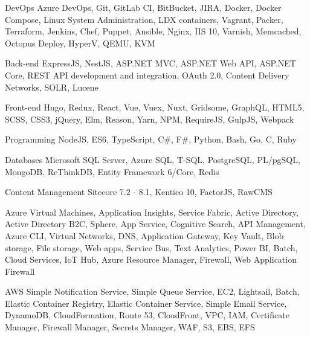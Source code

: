 

\begin{cvskills}

  \cvskill
    {DevOps} %
    {Azure DevOps, Git, GitLab CI, BitBucket, JIRA, Docker, Docker Compose, Linux System Administration, LDX containers, Vagrant, Packer, Terraform, Jenkins, Chef, Puppet, Ansible, Nginx, IIS 10, Varnish, Memcached, Octopus Deploy, HyperV, QEMU, KVM} %

  \cvskill
    {Back-end} %
    {ExpressJS, NestJS, ASP.NET MVC, ASP.NET Web API, ASP.NET Core, REST API development and integration, OAuth 2.0, Content Delivery Networks, SOLR, Lucene} %

  \cvskill
    {Front-end} %
    {Hugo, Redux, React, Vue, Vuex, Nuxt, Gridsome, GraphQL, HTML5, SCSS, CSS3, jQuery, Elm, Reason, Yarn, NPM, RequireJS, GulpJS, Webpack} %

  \cvskill
    {Programming} %
    {NodeJS, ES6, TypeScript, C\#, F\#, Python, Bash, Go, C, Ruby} %

  \cvskill
    {Databases} %
    {Microsoft SQL Server, Azure SQL, T-SQL, PostgreSQL, PL/pgSQL, MongoDB, ReThinkDB, Entity Framework 6/Core, Redis} %

  \cvskill
    {Content Management} %
    {Sitecore 7.2 - 8.1, Kentico 10, FactorJS, RawCMS} %

  \cvskill
    {Azure} %
    {Virtual Machines, Application Insights, Service Fabric, Active Directory, Active Directory B2C, Sphere, App Service, Cognitive Search, API Management, Azure CLI, Virtual Networks, DNS, Application Gateway, Key Vault, Blob storage, File storage, Web apps, Service Bus, Text Analytics, Power BI, Batch, Cloud Services, IoT Hub, Azure Resource Manager, Firewall, Web Application Firewall} %

  \cvskill
    {AWS} %
    {Simple Notification Service, Simple Queue Service, EC2, Lightsail, Batch, Elastic Container Registry, Elastic Container Service, Simple Email Service, DynamoDB, CloudFormation, Route 53, CloudFront, VPC, IAM, Certificate Manager, Firewall Manager, Secrets Manager, WAF, S3, EBS, EFS} %

\end{cvskills}
